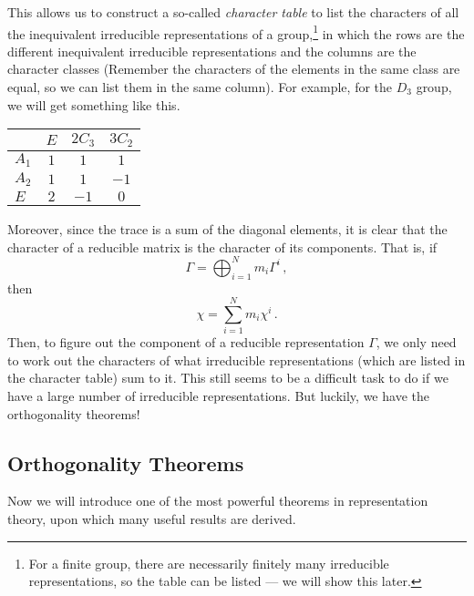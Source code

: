 \documentclass{article}
\theoremstyle{plain}\theoremheaderfont{\normalfont\itshape}\theorembodyfont{\rmfamily}\theoremseparator{.}\newtheorem*{rem}{Remark}\newtheorem*{ex}{Example}\newtheorem*{proof}{Proof}\newtheorem*{altp}{Alternative proof}
\theoremstyle{plain}\theoremheaderfont{\normalfont\bfseries}\theorembodyfont{\rmfamily}\theoremseparator{.}\newtheorem{thm}{Theorem}[section]\newtheorem{lem}[thm]{Lemma}\newtheorem{prop}[thm]{Proposition}\newtheorem*{cor}{Corollary}\newtheorem{defn}[thm]{Definition}\newtheorem{clm}[thm]{Claim}\newtheorem{clminproof}{Claim}\newtheorem*{law}{Law}\newtheorem{pos}[thm]{Postulate}
\theoremstyle{break}\theoremheaderfont{\normalfont\itshape}\theorembodyfont{\rmfamily}\theoremseparator{.\medskip}\newtheorem*{proofskip}{Proof}\newtheorem*{exs}{Examples}\newtheorem*{rems}{Remarks}
\theoremstyle{break}\theoremheaderfont{\normalfont\bfseries}\theorembodyfont{\rmfamily}\theoremseparator{.\medskip}\newtheorem{lemskip}[thm]{Lemma}\newtheorem{defnskip}[thm]{Definition}\newtheorem{propskip}[thm]{Proposition}\newtheorem{thmskip}[thm]{Theorem}
\numberwithin{equation}{section}
\begin{document}
    This allows us to construct a so-called \textit{character table} to list the characters of all the inequivalent irreducible representations of a group,\footnote{For a finite group, there are necessarily finitely many irreducible representations, so the table can be listed --- we will show this later.} in which the rows are the different inequivalent irreducible representations and the columns are the character classes (Remember the characters of the elements in the same class are equal, so we can list them in the same column). For example, for the \(D_3\) group, we will get something like this.
    \begin{table}[ht!]
        \centering
        \begin{tabular}{lccc}
            \toprule & \(E\) & \(2C_3\) & \(3C_2\) \\ \midrule
            \(A_1\) & \(1\) & \(1\) & \(1\) \\
            \(A_2\) & \(1\) & \(1\) & \(-1\) \\
            \(E\) & \(2\) & \(-1\) & \(0\) \\ \bottomrule
        \end{tabular}
    \end{table}

    Moreover, since the trace is a sum of the diagonal elements, it is clear that the character of a reducible matrix is the character of its components. That is, if
    \begin{equation}
        \Gamma=\bigoplus_{i=1}^{N}m_i\Gamma^{i}\,,
    \end{equation}
    then
    \begin{equation}
        \chi=\sum_{i=1}^{N}m_i\chi^{i}\,.
    \end{equation}
    Then, to figure out the component of a reducible representation \(\Gamma\), we only need to work out the characters of what irreducible representations (which are listed in the character table) sum to it. This still seems to be a difficult task to do if we have a large number of irreducible representations. But luckily, we have the orthogonality theorems!
    
    \subsection{Orthogonality Theorems}
    Now we will introduce one of the most powerful theorems in representation theory, upon which many useful results are derived.
\end{document}
